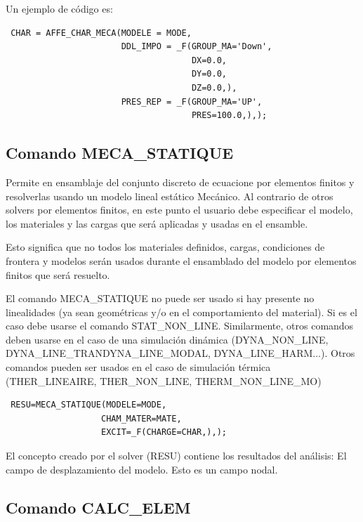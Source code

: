 \documentclass[12pt]{book}
\theoremstyle{definition}
\theoremstyle{remark}
\theoremstyle{plain}
\begin{document}
Un ejemplo de código es:

\begin{verbatim}
 CHAR = AFFE_CHAR_MECA(MODELE = MODE, 
                       DDL_IMPO = _F(GROUP_MA='Down',
                                     DX=0.0,
                                     DY=0.0,
                                     DZ=0.0,),
                       PRES_REP = _F(GROUP_MA='UP',
                                     PRES=100.0,),);
\end{verbatim}

\subsection{Comando MECA\_STATIQUE}

Permite en ensamblaje del conjunto discreto de ecuacione por elementos finitos 
y resolverlas usando un modelo lineal estático Mecánico. Al contrario de otros solvers 
por elementos finitos, en este punto el usuario debe especificar el modelo, 
los materiales y las cargas que será aplicadas y usadas en el ensamble.

Esto significa que no todos los materiales definidos, cargas, condiciones de 
frontera y modelos serán usados durante el ensamblado del modelo por elementos
finitos que será resuelto.

El comando MECA\_STATIQUE no puede ser usado si hay presente no linealidades (ya sean 
geométricas y/o en el comportamiento del material). Si es el caso debe usarse 
el comando STAT\_NON\_LINE. Similarmente, otros comandos deben usarse en el caso de 
una simulación dinámica (DYNA\_NON\_LINE, DYNA\_LINE\_TRAN\/DYNA\_LINE\_MODAL, 
DYNA\_LINE\_HARM...). Otros comandos pueden ser usados en el caso de simulación térmica
 (THER\_LINEAIRE, THER\_NON\_LINE, THERM\_NON\_LINE\_MO)


\begin{verbatim}
 RESU=MECA_STATIQUE(MODELE=MODE,
                   CHAM_MATER=MATE,
                   EXCIT=_F(CHARGE=CHAR,),);
\end{verbatim} 

El concepto creado por el solver (RESU) contiene los resultados del análisis: El
campo de desplazamiento del modelo. Esto es un campo nodal.

\subsection{Comando CALC\_ELEM}
\end{document}
